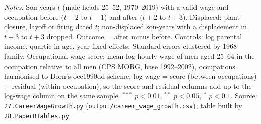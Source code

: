 \begin{table}[!htbp]
{{\begin{tabular}{lccccc}
\bottomrule
\end{tabular}}}
\par\smallskip
\begin{minipage}{\textwidth}\footnotesize \textit{Notes:} Son-years $t$ (male heads 25--52, 1970--2019) with a valid wage and occupation before ($t-2$ to $t-1$) and after ($t+2$ to $t+3$). Displaced: plant closure, layoff or firing dated $t$; non-displaced son-years with a displacement in $t-3$ to $t+3$ dropped. Outcome = after minus before. Controls: log parental income, quartic in age, year fixed effects. Standard errors clustered by 1968 family. Occupational wage score: mean log hourly wage of men aged 25--64 in the occupation relative to all men (CPS MORG, base 1992--2002), occupations harmonised to Dorn's occ1990dd scheme; log wage = score (between occupations) + residual (within occupation), so the score and residual columns add up to the log-wage column on the same sample. $^{***}$ $p<0.01$, $^{**}$ $p<0.05$, $^{*}$ $p<0.1$. Source: \texttt{27.CareerWageGrowth.py} (\texttt{output/career\_wage\_growth.csv}); table built by \texttt{28.PaperBTables.py}.\end{minipage}
\end{table}

